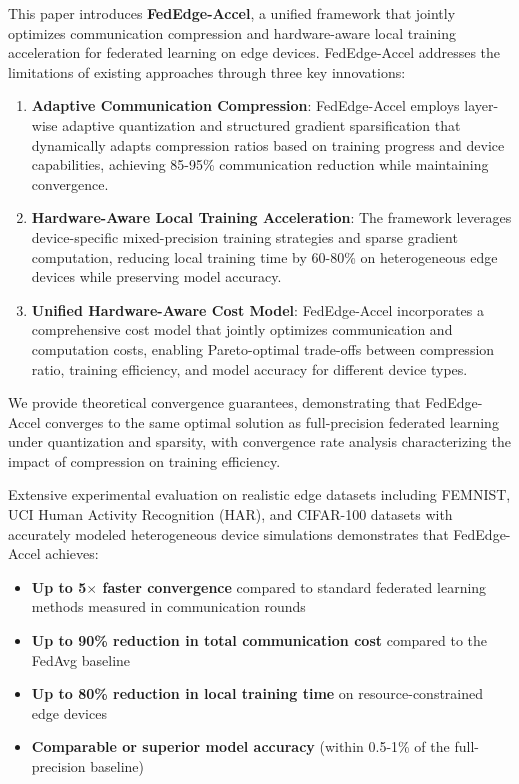 \documentclass[journal]{IEEEtran}
\begin{document}
This paper introduces \textbf{FedEdge-Accel}, a unified framework that jointly optimizes communication compression and hardware-aware local training acceleration for federated learning on edge devices. FedEdge-Accel addresses the limitations of existing approaches through three key innovations:

\begin{enumerate}
    \item \textbf{Adaptive Communication Compression}: FedEdge-Accel employs layer-wise adaptive quantization and structured gradient sparsification that dynamically adapts compression ratios based on training progress and device capabilities, achieving 85-95\% communication reduction while maintaining convergence.
    
    \item \textbf{Hardware-Aware Local Training Acceleration}: The framework leverages device-specific mixed-precision training strategies and sparse gradient computation, reducing local training time by 60-80\% on heterogeneous edge devices while preserving model accuracy.
    
    \item \textbf{Unified Hardware-Aware Cost Model}: FedEdge-Accel incorporates a comprehensive cost model that jointly optimizes communication and computation costs, enabling Pareto-optimal trade-offs between compression ratio, training efficiency, and model accuracy for different device types.
\end{enumerate}

We provide theoretical convergence guarantees, demonstrating that FedEdge-Accel converges to the same optimal solution as full-precision federated learning under quantization and sparsity, with convergence rate analysis characterizing the impact of compression on training efficiency.

Extensive experimental evaluation on realistic edge datasets including FEMNIST, UCI Human Activity Recognition (HAR), and CIFAR-100 datasets with accurately modeled heterogeneous device simulations demonstrates that FedEdge-Accel achieves:
\begin{itemize}
    \item \textbf{Up to 5$\times$ faster convergence} compared to standard federated learning methods measured in communication rounds
    \item \textbf{Up to 90\% reduction in total communication cost} compared to the FedAvg baseline
    \item \textbf{Up to 80\% reduction in local training time} on resource-constrained edge devices
    \item \textbf{Comparable or superior model accuracy} (within 0.5-1\% of the full-precision baseline)
\end{itemize}
\end{document}
